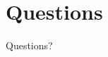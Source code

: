 \documentclass[t, aspectratio=169, 10pt]{beamer}
\begin{document}
\section*{Questions}
\begin{frame}
    \centering
    \vspace{2cm}
    {\Huge \textcolor{elmagBlueL}{Questions?}}
\end{frame}
\end{document}

